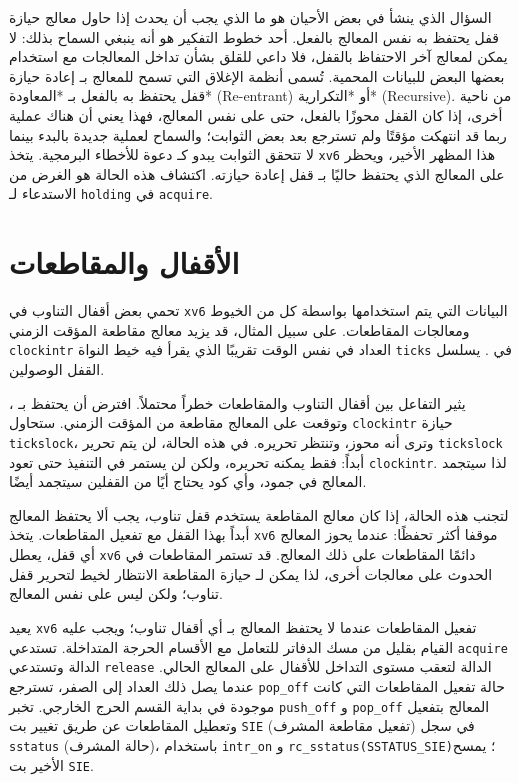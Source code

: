السؤال الذي ينشأ في بعض الأحيان هو ما الذي يجب أن يحدث إذا حاول معالج حيازة قفل يحتفظ به نفس المعالج بالفعل.
أحد خطوط التفكير هو أنه ينبغي السماح بذلك: لا يمكن لمعالج آخر الاحتفاظ بالقفل، فلا داعي للقلق بشأن تداخل المعالجات مع استخدام بعضها البعض للبيانات المحمية.
تُسمى أنظمة الإغلاق التي تسمح للمعالج بـ إعادة حيازة قفل يحتفظ به بالفعل بـ *المعاودة* (Re-entrant) أو *التكرارية* (Recursive).
من ناحية أخرى، إذا كان القفل محوزًا بالفعل، حتى على نفس المعالج، فهذا يعني أن هناك عملية ربما قد انتهكت مؤقتًا ولم تسترجع بعد بعض الثوابت؛
والسماح لعملية جديدة بالبدء بينما لا تتحقق الثوابت يبدو كـ دعوة للأخطاء البرمجية.
يتخذ \texttt{xv6} هذا المظهر الأخير، ويحظر على المعالج الذي يحتفظ حاليًا بـ قفل إعادة حيازته.
اكتشاف هذه الحالة هو الغرض من الاستدعاء لـ {\tt holding} في {\tt acquire}.

\section{الأقفال والمقاطعات}
\label{s:lockinter}

تحمي بعض أقفال التناوب في \texttt{xv6} البيانات التي يتم استخدامها بواسطة كل من الخيوط ومعالجات المقاطعات.
على سبيل المثال، قد يزيد معالج مقاطعة المؤقت الزمني \lstinline{clockintr} العداد  في نفس الوقت تقريبًا الذي يقرأ فيه خيط النواة \lstinline{ticks} في .
يسلسل القفل  الوصولين.

يثير التفاعل بين أقفال التناوب والمقاطعات خطراً محتملاً.
افترض أن  يحتفظ بـ ، وتوقعت على المعالج مقاطعة من المؤقت الزمني.
ستحاول \lstinline{clockintr} حيازة \lstinline{tickslock}، وترى أنه محوز، وتنتظر تحريره.
في هذه الحالة، لن يتم تحرير \lstinline{tickslock} أبداً: فقط  يمكنه تحريره، ولكن  لن يستمر في التنفيذ حتى تعود \lstinline{clockintr}.
لذا سيتجمد المعالج في جمود، وأي كود يحتاج أيًا من القفلين سيتجمد أيضًا.

لتجنب هذه الحالة، إذا كان معالج المقاطعة يستخدم قفل تناوب، يجب ألا يحتفظ المعالج أبداً بهذا القفل مع تفعيل المقاطعات.
يتخذ \texttt{xv6} موقفا أكثر تحفظًا: عندما يحوز المعالج أي قفل، يعطل \texttt{xv6} دائمًا المقاطعات على ذلك المعالج.
قد تستمر المقاطعات في الحدوث على معالجات أخرى، لذا يمكن لـ حيازة المقاطعة الانتظار لخيط لتحرير قفل تناوب؛ ولكن ليس على نفس المعالج.

يعيد \texttt{xv6} تفعيل المقاطعات عندما لا يحتفظ المعالج بـ أي أقفال تناوب؛ ويجب عليه القيام بقليل من مسك الدفاتر للتعامل مع الأقسام الحرجة المتداخلة.
تستدعي \lstinline{acquire} الدالة  وتستدعي \lstinline{release} الدالة  لتعقب مستوى التداخل للأقفال على المعالج الحالي.
عندما يصل ذلك العداد إلى الصفر، تسترجع \lstinline{pop_off} حالة تفعيل المقاطعات التي كانت موجودة في بداية القسم الحرج الخارجي.
تخبر \lstinline{push_off} و \lstinline{pop_off} المعالج بتفعيل وتعطيل المقاطعات عن طريق تغيير بت \lstinline{SIE} (تفعيل مقاطعة المشرف) في سجل \lstinline{sstatus} (حالة المشرف)، باستخدام \lstinline{intr_on} و \lstinline{rc_sstatus(SSTATUS_SIE)}؛ يمسح الأخير بت \lstinline{SIE}.


